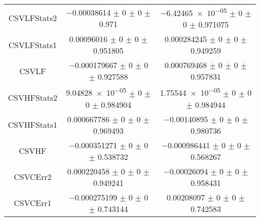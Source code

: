 \begin{table}
\begin{tabular}{ccc}
CSVLFStats2 	& \num{-0.00038614} $\pm$ \num{0} $\pm$ \num{0} $\pm$ \num{0.971} 	& \num{-6.42465e-05} $\pm$ \num{0} $\pm$ \num{0} $\pm$ \num{0.971075}\\
CSVLFStats1 	& \num{0.00096016} $\pm$ \num{0} $\pm$ \num{0} $\pm$ \num{0.951805} 	& \num{0.000284245} $\pm$ \num{0} $\pm$ \num{0} $\pm$ \num{0.949259}\\
CSVLF 	& \num{-0.000179667} $\pm$ \num{0} $\pm$ \num{0} $\pm$ \num{0.927588} 	& \num{0.000769468} $\pm$ \num{0} $\pm$ \num{0} $\pm$ \num{0.957831}\\
CSVHFStats2 	& \num{9.04828e-05} $\pm$ \num{0} $\pm$ \num{0} $\pm$ \num{0.984904} 	& \num{1.75544e-05} $\pm$ \num{0} $\pm$ \num{0} $\pm$ \num{0.984944}\\
CSVHFStats1 	& \num{0.000667786} $\pm$ \num{0} $\pm$ \num{0} $\pm$ \num{0.969493} 	& \num{-0.00140895} $\pm$ \num{0} $\pm$ \num{0} $\pm$ \num{0.980736}\\
CSVHF 	& \num{-0.000351271} $\pm$ \num{0} $\pm$ \num{0} $\pm$ \num{0.538732} 	& \num{-0.000986441} $\pm$ \num{0} $\pm$ \num{0} $\pm$ \num{0.568267}\\
CSVCErr2 	& \num{0.000220458} $\pm$ \num{0} $\pm$ \num{0} $\pm$ \num{0.949241} 	& \num{-0.00026094} $\pm$ \num{0} $\pm$ \num{0} $\pm$ \num{0.958431}\\
CSVCErr1 	& \num{-0.000275199} $\pm$ \num{0} $\pm$ \num{0} $\pm$ \num{0.743144} 	& \num{0.00208097} $\pm$ \num{0} $\pm$ \num{0} $\pm$ \num{0.742583}\\
\bottomrule
\end{tabular}
\end{table}